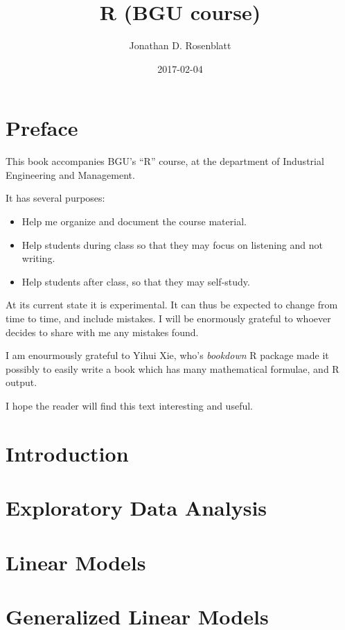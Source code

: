 \documentclass[]{book}
\title{R (BGU course)}
\author{Jonathan D. Rosenblatt}
\date{2017-02-04}
\providecommand{\tightlist}{%
  \setlength{\itemsep}{0pt}\setlength{\parskip}{0pt}}
\begin{document}
\maketitle

{
\setcounter{tocdepth}{1}
\tableofcontents
}
\chapter{Preface}\label{preface}

This book accompanies BGU's ``R'' course, at the department of
Industrial Engineering and Management.

It has several purposes:

\begin{itemize}
\tightlist
\item
  Help me organize and document the course material.
\item
  Help students during class so that they may focus on listening and not
  writing.
\item
  Help students after class, so that they may self-study.
\end{itemize}

At its current state it is experimental. It can thus be expected to
change from time to time, and include mistakes. I will be enormously
grateful to whoever decides to share with me any mistakes found.

I am enourmously grateful to Yihui Xie, who's \emph{bookdown} R package
made it possibly to easily write a book which has many mathematical
formulae, and R output.

I hope the reader will find this text interesting and useful.

\chapter{Introduction}\label{intro}

\chapter{Exploratory Data Analysis}\label{eda}

\chapter{Linear Models}\label{lm}

\chapter{Generalized Linear Models}\label{glm}
\end{document}
